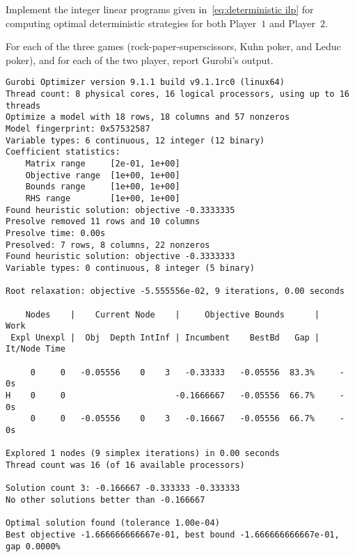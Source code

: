 \documentclass{homework}
\begin{document}
\begin{problem}[20 points]\label{prob:deterministic strat}
    Implement the integer linear programs given in~\eqref{eq:deterministic ilp} for computing optimal deterministic strategies for both Player~$1$ and Player~$2$. 
    
    For each of the three games (rock-paper-superscissors, Kuhn poker, and Leduc poker), and for each of the two player, report Gurobi's output. 
\end{problem}
\begin{solution}
    \color{violet}\begin{verbatim}
Gurobi Optimizer version 9.1.1 build v9.1.1rc0 (linux64)
Thread count: 8 physical cores, 16 logical processors, using up to 16 threads
Optimize a model with 18 rows, 18 columns and 57 nonzeros
Model fingerprint: 0x57532587
Variable types: 6 continuous, 12 integer (12 binary)
Coefficient statistics:
    Matrix range     [2e-01, 1e+00]
    Objective range  [1e+00, 1e+00]
    Bounds range     [1e+00, 1e+00]
    RHS range        [1e+00, 1e+00]
Found heuristic solution: objective -0.3333335
Presolve removed 11 rows and 10 columns
Presolve time: 0.00s
Presolved: 7 rows, 8 columns, 22 nonzeros
Found heuristic solution: objective -0.3333333
Variable types: 0 continuous, 8 integer (5 binary)

Root relaxation: objective -5.555556e-02, 9 iterations, 0.00 seconds

    Nodes    |    Current Node    |     Objective Bounds      |     Work
 Expl Unexpl |  Obj  Depth IntInf | Incumbent    BestBd   Gap | It/Node Time

     0     0   -0.05556    0    3   -0.33333   -0.05556  83.3%     -    0s
H    0     0                      -0.1666667   -0.05556  66.7%     -    0s
     0     0   -0.05556    0    3   -0.16667   -0.05556  66.7%     -    0s

Explored 1 nodes (9 simplex iterations) in 0.00 seconds
Thread count was 16 (of 16 available processors)

Solution count 3: -0.166667 -0.333333 -0.333333
No other solutions better than -0.166667

Optimal solution found (tolerance 1.00e-04)
Best objective -1.666666666667e-01, best bound -1.666666666667e-01, gap 0.0000%
    \end{verbatim}
\end{solution}
\end{document}
